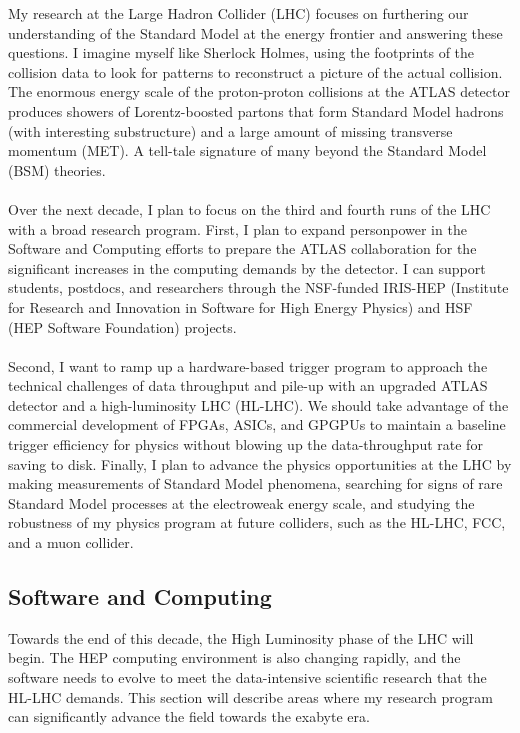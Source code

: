 My research at the Large Hadron Collider (LHC) focuses on furthering our understanding of the Standard Model at the energy frontier and answering these questions. I imagine myself like Sherlock Holmes, using the footprints of the collision data to look for patterns to reconstruct a picture of the actual collision. The enormous energy scale of the proton-proton collisions at the ATLAS detector produces showers of Lorentz-boosted partons that form Standard Model hadrons (with interesting substructure) and a large amount of missing transverse momentum (MET). A tell-tale signature of many beyond the Standard Model (BSM) theories.
\\
\\
Over the next decade, I plan to focus on the third and fourth runs of the LHC with a broad research program. First, I plan to expand personpower in the Software and Computing efforts to prepare the ATLAS collaboration for the significant increases in the computing demands by the detector. I can support students, postdocs, and researchers through the NSF-funded IRIS-HEP (Institute for Research and Innovation in Software for High Energy Physics) and HSF (HEP Software Foundation) projects.
\\
\\
Second, I want to ramp up a hardware-based trigger program to approach the technical challenges of data throughput and pile-up with an upgraded ATLAS detector and a high-luminosity LHC (HL-LHC). We should take advantage of the commercial development of FPGAs, ASICs, and GPGPUs to maintain a baseline trigger efficiency for physics without blowing up the data-throughput rate for saving to disk. Finally, I plan to advance the physics opportunities at the LHC by making measurements of Standard Model phenomena, searching for signs of rare Standard Model processes at the electroweak energy scale, and studying the robustness of my physics program at future colliders, such as the HL-LHC, FCC, and a muon collider.

\subsection{Software and Computing} \label{ssec:software-and-computing}
Towards the end of this decade, the High Luminosity phase of the LHC will begin. The HEP computing environment is also changing rapidly, and the software needs to evolve to meet the data-intensive scientific research that the HL-LHC demands. This section will describe areas where my research program can significantly advance the field towards the exabyte era.

